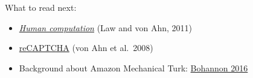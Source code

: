 \documentclass[aspectratio=169]{beamer}
\begin{document}
\begin{frame}

What to read next:
\begin{itemize}
\item \href{https://dl.acm.org/doi/book/10.5555/2049960}{\textit{Human computation}} (Law and von Ahn, 2011)
\item \href{https://dx.doi.org/10.1126/science.1160379}{reCAPTCHA} (von Ahn et al.\ 2008) 
\item Background about Amazon Mechanical Turk: \href{https://dx.doi.org/10.1126/science.352.6291.1263}{Bohannon 2016}
\end{itemize}

\end{frame}
\frame{\titlepage}
\end{document}
